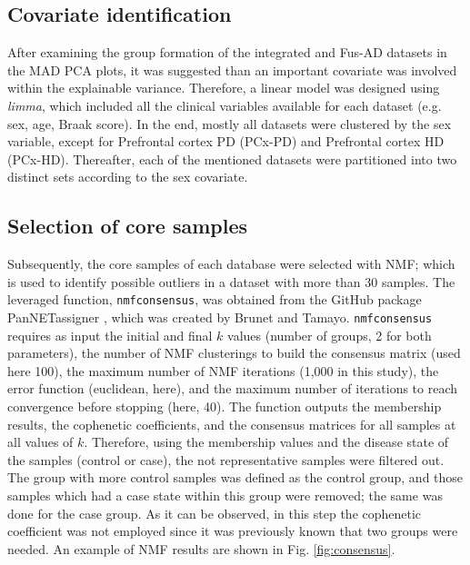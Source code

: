\subsection{Covariate identification} \label{cov-method}

After examining the group formation of the integrated and Fus-AD datasets in the MAD PCA plots, it was suggested than an important covariate was involved within the explainable variance. Therefore, a linear model was designed using \textit{limma}, which included all the clinical variables available for each dataset (e.g. sex, age, Braak score). In the end, mostly all datasets were clustered by the sex variable, except for Prefrontal cortex PD (PCx-PD) and Prefrontal cortex HD (PCx-HD). Thereafter, each of the mentioned datasets were partitioned into two distinct sets according to the sex covariate.

\subsection{Selection of core samples} \label{hete-method}

Subsequently, the core samples of each database were selected with NMF; which is used to identify possible outliers in a dataset with more than 30 samples. The leveraged function, \verb|nmfconsensus|, was obtained from the GitHub package PanNETassigner \cite{pannet}, which was created by Brunet and Tamayo. \verb|nmfconsensus| requires as input the initial and final $k$ values (number of groups, 2 for both parameters), the number of NMF clusterings to build the consensus matrix (used here 100), the maximum number of NMF iterations (1,000 in this study), the error function (euclidean, here), and the maximum number of iterations to reach convergence before stopping (here, 40). The function outputs the membership results, the cophenetic coefficients, and the consensus matrices for all samples at all values of $k$. Therefore, using the membership values and the disease state of the samples (control or case), the not representative samples were filtered out. The group with more control samples was defined as the control group, and those samples which had a case state within this group were removed; the same was done for the case group. As it can be observed, in this step the cophenetic coefficient was not employed since it was previously known that two groups were needed. An example of NMF results are shown in Fig. \ref{fig:consensus}.

